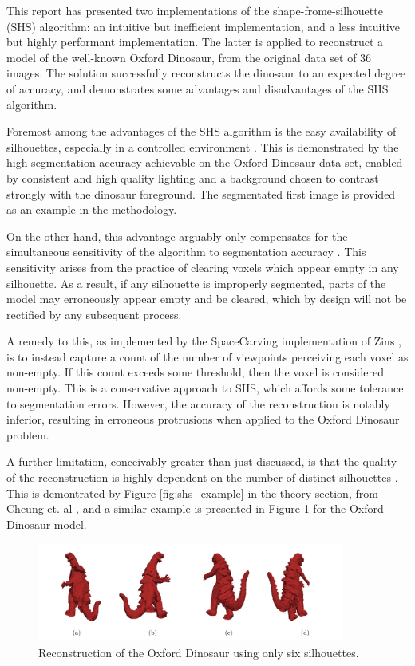 This report has presented two implementations of the shape-frome-silhouette (SHS) algorithm: an intuitive but inefficient implementation, and a less intuitive but highly performant implementation. The latter is applied to reconstruct a model of the well-known Oxford Dinosaur, from the original data set of 36 images. The solution successfully reconstructs the dinosaur to an expected degree of accuracy, and demonstrates some advantages and disadvantages of the SHS algorithm.

Foremost among the advantages of the SHS algorithm is the easy availability of silhouettes, especially in a controlled environment \cite{cheung_2005}. This is demonstrated by the high segmentation accuracy achievable on the Oxford Dinosaur data set, enabled by consistent and high quality lighting and a background chosen to contrast strongly with the dinosaur foreground. The segmentated first image is provided as an example in the methodology.

On the other hand, this advantage arguably only compensates for the simultaneous sensitivity of the algorithm to segmentation accuracy \cite{lovell_2023b}. This sensitivity arises from the practice of clearing voxels which appear empty in any silhouette. As a result, if any silhouette is improperly segmented, parts of the model may erroneously appear empty and be cleared, which by design will not be rectified by any subsequent process.

A remedy to this, as implemented by the SpaceCarving implementation of Zins \cite{zins_2019}, is to instead capture a count of the number of viewpoints perceiving each voxel as non-empty. If this count exceeds some threshold, then the voxel is considered non-empty. This is a conservative approach to SHS, which affords some tolerance to segmentation errors. However, the accuracy of the reconstruction is notably inferior, resulting in erroneous protrusions when applied to the Oxford Dinosaur problem.

A further limitation, conceivably greater than just discussed, is that the quality of the reconstruction is highly dependent on the number of distinct silhouettes \cite{cheung_2005}. This is demontrated by Figure \ref{fig:shs_example} in the theory section, from Cheung et. al \cite{cheung_2005}, and a similar example is presented in Figure \ref{fig:bad_reconstruction} for the Oxford Dinosaur model.

\begin{figure}[ht]
  \centering
  \includegraphics[width=0.9\textwidth]{images/q2_bad_reconstruction.png}
  \caption{Reconstruction of the Oxford Dinosaur using only six silhouettes.}
  \label{fig:bad_reconstruction}
\end{figure}

